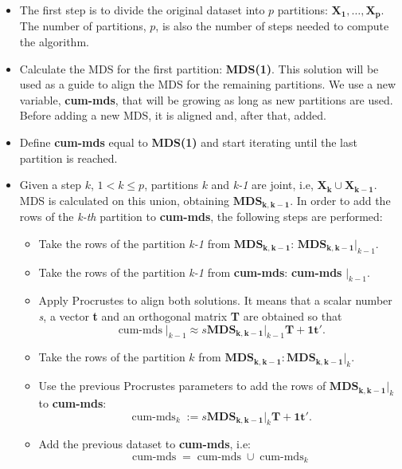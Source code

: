 \documentclass[11pt]{report}
\DeclareMathOperator{\cummds}{cum-mds}
\begin{document}
\begin{itemize}

\item The first step is to divide the original dataset into $p$ partitions: 
$\mathbf{X_1},\dots, \mathbf{X_p}$. The number of partitions, $p$, is also
the number of steps needed to compute the algorithm.

\item Calculate the MDS for the first partition: \textbf{MDS(1)}. This solution
will be used as a guide to align the MDS for the remaining partitions. We 
use a new variable, \textbf{cum-mds}, that will be growing as long as new 
partitions are used. Before adding a new MDS, it is aligned and, after 
that, added. 

\item Define \textbf{cum-mds} equal to \textbf{MDS(1)} and start iterating 
until the last partition is reached.

\item Given a step $k$, $1 < k \leq p$, partitions $k$ and \textit{k-1} are 
joint, i.e, $\mathbf{X_k} \cup \mathbf{X_{k-1}}$. MDS is calculated on 
this union, obtaining $\mathbf{MDS_{k, k-1}}$. In order to add the
rows of the \textit{k-th} partition to \textbf{cum-mds}, the following steps 
are performed:

\begin{itemize}
\item Take the rows of the partition \textit{k-1} from $\mathbf{MDS_{k, k-1}}$: 
$\mathbf{MDS_{k, k-1}} \Bigr|_{k-1}$.
\item Take the rows of the partition \textit{k-1} from \textbf{cum-mds}: 
\textbf{cum-mds} $\Bigr|_{k-1}$.
\item Apply Procrustes to align both solutions. It means that a scalar number
\textit{s}, a vector \textbf{t} and an orthogonal matrix \textbf{T} are obtained
so that
\[
\mathbf{\cummds} \Bigr|_{k-1} \approx s \mathbf{MDS_{k, k-1}} \Bigr|_{k-1} \mathbf{T} + \mathbf{1t'}.
\]
\item Take the rows of the partition $k$ from $\mathbf{MDS_{k, k-1}}: \mathbf{MDS_{k, k-1}} \Bigr|_{k}$.
\item Use the previous Procrustes parameters to add the rows of 
$\mathbf{MDS_{k, k-1}} \Bigr|_{k}$ to \textbf{cum-mds}:
\[
\mathbf{\cummds}_k := s \mathbf{MDS_{k, k-1}} \Bigr|_{k} \mathbf{T} + \mathbf{1t}'.
\]
\item Add the previous dataset to \textbf{cum-mds}, i.e:
\[
\mathbf{\cummds} = \mathbf{\cummds} \cup \mathbf{\cummds}_k
\]

\end{itemize}
\end{itemize}
\end{document}
